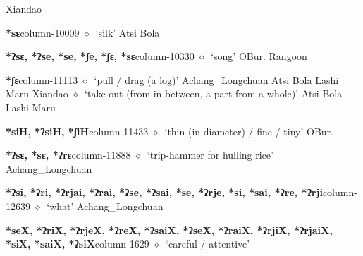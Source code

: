          Xiandao 
  \item {\footnotesize \textbf{*sɛ}}{\tiny column-10009}
         $\diamond$~`silk'
         Atsi 
\hspace{1ex}
         Bola 
  \item {\footnotesize \textbf{*ʔsɛ, *ʔse, *se, *ʃe, *ʃɛ, *sɛ}}{\tiny column-10330}
         $\diamond$~`song'
         OBur. 
\hspace{1ex}
         Rangoon 
  \item {\footnotesize \textbf{*ʃɛ}}{\tiny column-11113}
         $\diamond$~`pull / drag (a log)'
         Achang\_Longchuan 
\hspace{1ex}
         Atsi 
\hspace{1ex}
         Bola 
\hspace{1ex}
         Lashi 
\hspace{1ex}
         Maru 
\hspace{1ex}
         Xiandao 
\hspace{1ex}
         $\diamond$~`take out (from in between, a part from a whole)'
         Atsi 
\hspace{1ex}
         Bola 
\hspace{1ex}
         Lashi 
\hspace{1ex}
         Maru 
  \item {\footnotesize \textbf{*siH, *ʔsiH, *ʃiH}}{\tiny column-11433}
         $\diamond$~`thin (in diameter) / fine / tiny'
         OBur. 
  \item {\footnotesize \textbf{*ʔsɛ, *sɛ, *ʔrɛ}}{\tiny column-11888}
         $\diamond$~`trip-hammer for hulling rice'
         Achang\_Longchuan 
  \item {\footnotesize \textbf{*ʔsi, *ʔri, *ʔrjai, *ʔrai, *ʔse, *ʔsai, *se, *ʔrje, *si, *sai, *ʔre, *ʔrji}}{\tiny column-12639}
         $\diamond$~`what'
         Achang\_Longchuan 
  \item {\footnotesize \textbf{*seX, *ʔriX, *ʔrjeX, *ʔreX, *ʔsaiX, *ʔseX, *ʔraiX, *ʔrjiX, *ʔrjaiX, *siX, *saiX, *ʔsiX}}{\tiny column-1629}
         $\diamond$~`careful / attentive'
